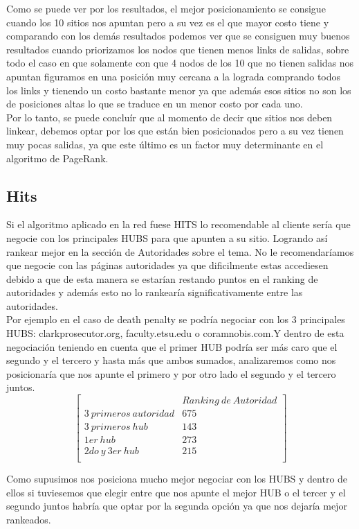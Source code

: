 Como se puede ver por los resultados, el mejor posicionamiento se consigue cuando los 10 sitios nos apuntan pero a su vez es el que mayor costo tiene y comparando con los demás resultados podemos ver que se consiguen muy buenos resultados cuando priorizamos los nodos que tienen menos links de salidas, sobre todo el caso en que solamente con que 4 nodos de los 10 que no tienen salidas nos apuntan figuramos en una posición muy cercana a la lograda comprando todos los links y tienendo un costo bastante menor ya que además esos sitios no son los de posiciones altas lo que se traduce en un menor costo por cada uno.\\
Por lo tanto, se puede concluír que al momento de decir que sitios nos deben linkear, debemos optar por los que están bien posicionados pero a su vez tienen muy pocas salidas, ya que este último es un factor muy determinante en el algoritmo de PageRank. 

\subsection{Hits}
Si el algoritmo aplicado en la red fuese HITS lo recomendable al cliente sería que negocie con los principales HUBS para que apunten a su sitio. Logrando así rankear mejor en la sección de Autoridades sobre el tema. 
No le recomendaríamos que negocie con las páginas autoridades ya que dificilmente estas accediesen debido a que de esta manera se estarían restando puntos en el ranking de autoridades y además esto no lo rankearía significativamente entre las autoridades. \\
Por ejemplo en el caso de death penalty se podría negociar con los 3 principales HUBS: clarkprosecutor.org, faculty.etsu.edu o coramnobis.com.Y dentro de esta negociación teniendo en cuenta que el primer HUB podría ser más caro que el segundo y el tercero y hasta más que ambos sumados, analizaremos como nos posicionaría que nos apunte el primero y por otro lado el segundo y el tercero juntos.\\

$$
\begin{bmatrix}
	&      Ranking\ de\ Autoridad \\
3\ primeros\ autoridad 	&   	675         \\
3\ primeros\ hub	&     	143   \\
 1er\ hub 						& 		273 	\\
 2do\ y\ 3er\ hub 				& 		215 	\\
\end{bmatrix} 
$$

Como supusimos nos posiciona mucho mejor negociar con los HUBS y dentro de ellos si tuviesemos que elegir entre que nos apunte el mejor HUB o el tercer y el segundo juntos habría que optar por la segunda opción ya que nos dejaría mejor rankeados.
\newpage
